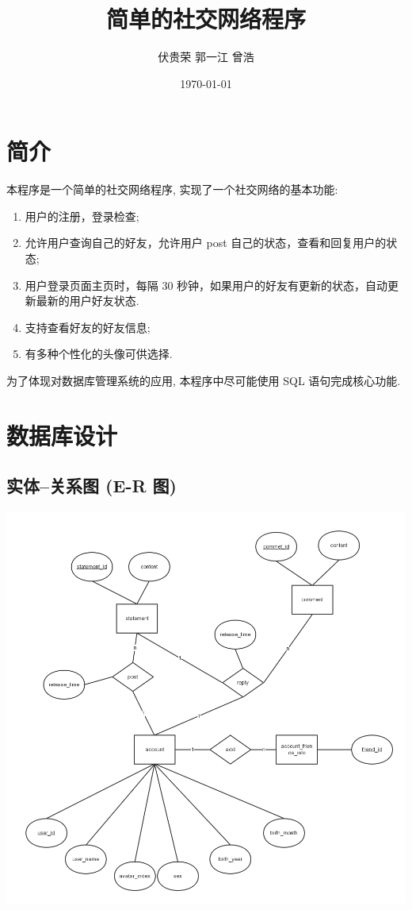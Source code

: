 \documentclass[a4paper,10pt]{article}
\title{简单的社交网络程序}
\author{伏贵荣 郭一江 曾浩}
\date{\today}
\begin{document}
\maketitle

\section{简介}

本程序是一个简单的社交网络程序, 实现了一个社交网络的基本功能:
\begin{enumerate}
	\item 用户的注册，登录检查;
	\item 允许用户查询自己的好友，允许用户 post 自己的状态，查看和回复用户的状态;
	\item 用户登录页面主页时，每隔 30 秒钟，如果用户的好友有更新的状态，自动更新最新的用户好友状态.
	\item 支持查看好友的好友信息;
	\item 有多种个性化的头像可供选择.
\end{enumerate}

为了体现对数据库管理系统的应用, 本程序中尽可能使用 SQL 语句完成核心功能.

\section{数据库设计}

\subsection{实体--关系图 (E-R 图)}

\includegraphics[width=\linewidth]{erd.png}
\end{document}
